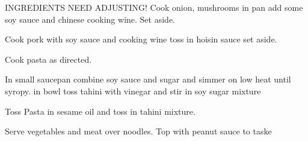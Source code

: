 INGREDIENTS NEED ADJUSTING!
Cook onion, mushrooms in pan add some soy sauce and chinese cooking wine. Set aside.

Cook pork with soy sauce and cooking wine toss in hoisin sauce set aside.

Cook pasta as directed. 

In small saucepan combine soy sauce and sugar and simmer on low heat until syropy. 
in bowl toss tahini with vinegar and stir in soy sugar mixture

Toss Pasta in sesame oil and toss in tahini mixture. 

Serve vegetables and meat over noodles. Top with peanut sauce to taske